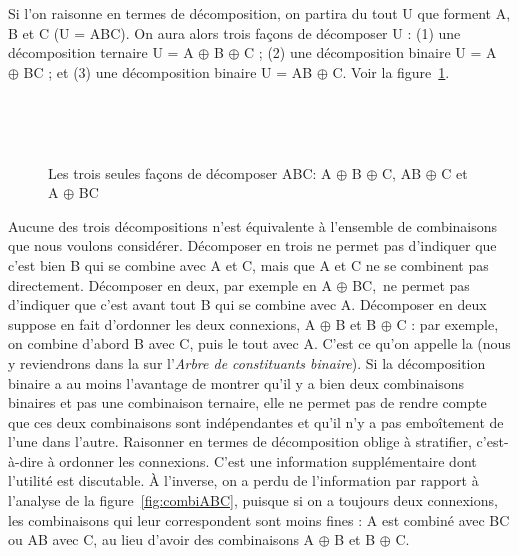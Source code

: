 Si l’on raisonne en termes de décomposition, on partira du tout U que forment A, B et C (U = ABC). On aura alors trois façons de décomposer U : (1) une décomposition ternaire U = A ${\oplus}$ B ${\oplus}$ C ; (2) une décomposition binaire U = A ${\oplus}$ BC ; et (3) une décomposition binaire U = AB ${\oplus}$ C. Voir la figure~\ref{fig:decompoABC}.

\begin{figure}
\\\medskip
{}\\\medskip
{}
\caption{Les trois seules façons de décomposer ABC: A $\oplus$ B $\oplus$ C, AB ${\oplus}$ C et A ${\oplus}$ BC\label{fig:decompoABC}}
\end{figure}

Aucune des trois décompositions n’est équivalente à l’ensemble de combinaisons que nous voulons considérer. Décomposer en trois ne permet pas d’indiquer que c’est bien B qui se combine avec A et C, mais que A et C ne se combinent pas directement. Décomposer en deux, par exemple en A ${\oplus}$ BC,~ne permet pas d’indiquer que c’est avant tout B qui se combine avec A. Décomposer en deux suppose en fait d’ordonner les deux connexions, A ${\oplus}$ B et B ${\oplus}$ C : par exemple, on combine d’abord B avec C, puis le tout avec A. C’est ce qu’on appelle la  (nous y reviendrons dans la  sur l’\textit{Arbre de constituants binaire}). Si la décomposition binaire a au moins l’avantage de montrer qu’il y a bien deux combinaisons binaires et pas une combinaison ternaire, elle ne permet pas de rendre compte que ces deux combinaisons sont indépendantes et qu’il n’y a pas emboîtement de l’une dans l’autre. Raisonner en termes de décomposition oblige à stratifier, c’est-à-dire à ordonner les connexions. C’est une information supplémentaire dont l’utilité est discutable. À l’inverse, on a perdu de l’information par rapport à l'analyse de la figure~\ref{fig:combiABC}, puisque si on a toujours deux connexions, les combinaisons qui leur correspondent sont moins fines : A est combiné avec BC ou AB avec C, au lieu d'avoir des combinaisons A ${\oplus}$ B et B ${\oplus}$ C.

